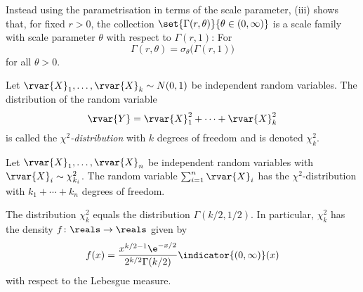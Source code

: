 \documentclass[article, a4paper, 11pt, oneside]{memoir}
\numberwithin{equation}{chapter}
\begin{document}
Instead using the parametrisation in terms of the scale parameter, (iii) shows that, for fixed $r > 0$, the collection $\set{ \Gamma(r,\theta) }{ \theta \in (0,\infty) }$ is a scale family with scale parameter $\theta$ with respect to $\Gamma(r,1)$: For
%
\begin{equation*}
    \Gamma(r,\theta)
        = \sigma_\theta \bigl( \Gamma(r,1) \bigr)
\end{equation*}
%
for all $\theta > 0$.


\begin{definition}
    Let $\rvar{X}_1, \ldots, \rvar{X}_k \sim N(0,1)$ be independent random variables. The distribution of the random variable
    \begin{equation*}
        \rvar{Y}
            = \rvar{X}_1^2 + \cdots + \rvar{X}_k^2
    \end{equation*}
    is called the \emph{$\chi^2$-distribution} with $k$ degrees of freedom and is denoted $\chi^2_k$.
\end{definition}


\begin{proposition}
    \begin{enumprop}
        \item Let $\rvar{X}_1, \ldots, \rvar{X}_n$ be independent random variables with $\rvar{X}_i \sim \chi^2_{k_i}$. The random variable $\sum_{i=1}^n \rvar{X}_i$ has the $\chi^2$-distribution with $k_1 + \cdots + k_n$ degrees of freedom.

        \item The distribution $\chi^2_k$ equals the distribution $\Gamma(k/2,1/2)$. In particular, $\chi^2_k$ has the density $f \colon \reals \to \reals$ given by
        \begin{equation*}
            f(x)
                = \frac{ x^{k/2-1} \e^{-x/2} }{2^{k/2} \Gamma(k/2)} \indicator{(0,\infty)}(x)
        \end{equation*}
        with respect to the Lebesgue measure.
    \end{enumprop}
\end{proposition}
\end{document}

